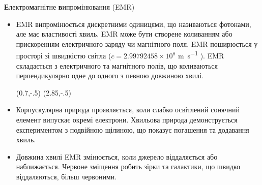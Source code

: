 {\Large {\bfseries Е}лектро{\bfseries м}агнітне {\bfseries в}ипромінювання (EMR)}
\begin{itemize}
\item EMR випромінюється дискретними одиницями, що називаються фотонами, але має властивості хвиль. EMR може бути створене коливанням або прискоренням електричного заряду чи магнітного поля. EMR поширюється у просторі зі швидкістю світла ($c=2.997 924 58 \times 10^{8}$ \si{\metre\per\second} ). EMR складається з електричного та магнітного полів, що коливаються перпендикулярно одне до одного з певною довжиною хвилі.

(0.7,-.5){}
(2.85,-.5){}

\vspace{1.45in}

\item Корпускулярна природа проявляється, коли слабко освітлений сонячний елемент випускає окремі електрони. Хвильова природа демонструється експериментом з подвійною щілиною, що показує погашення та додавання хвиль.



\item Довжина хвилі EMR змінюється, коли джерело віддаляється або наближається. Червоне зміщення робить зірки та галактики, що швидко віддаляються, більш червоними.

%


\end{itemize}
